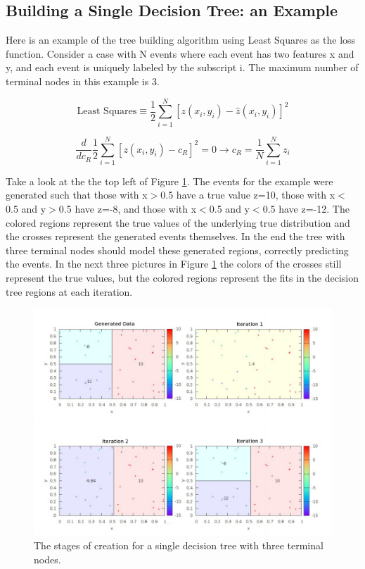 \documentclass[12pt]{article}
\begin{document}
\subsection{Building a Single Decision Tree: an Example}

Here is an example of the tree building algorithm using Least Squares as the loss function. Consider a case with N events where each event has two features x and y, and each event is uniquely labeled by the subscript i. The maximum number of terminal nodes in this example is 3.

\begin{equation}
\textrm{Least Squares} \equiv \frac{1}{2}\sum_{i=1}^{N} [z(x_i,y_i)-\hat{z}(x_i,y_i)]^2
\end{equation}

\begin{equation}
\frac{d}{dc_R}\frac{1}{2}\sum_{i=1}^{N} [z(x_i,y_i)-c_R]^2 = 0 \rightarrow c_R = \frac{1}{N}\sum_{i=1}^{N}z_i
\end{equation}

Take a look at the the top left of Figure \ref{fig:dtbuild}. The events for the example were generated such that those with x$>$0.5 have a true value z=10, those with x$<$0.5 and y$>$0.5 have z=-8, and those with x$<$0.5 and y$<$0.5 have z=-12. The colored regions represent the true values of the underlying true distribution and the crosses represent the generated events themselves. In the end the tree with three terminal nodes should model these generated regions, correctly predicting the events. In the next three pictures in Figure \ref{fig:dtbuild} the colors of the crosses still represent the true values, but the colored regions represent the fits in the decision tree regions at each iteration.

\begin{figure}[h!]
  \centering
  \includegraphics[width=6in]{imgs/BDT_featurespace_iteration.png}
  \caption
   {The stages of creation for a single decision tree with three terminal nodes.}
  \label{fig:dtbuild}
\end{figure}
\end{document}
